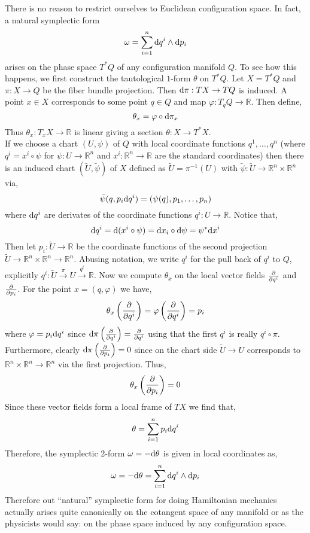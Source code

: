 \documentclass[12pt]{extarticle}
\newcommand{\R}{\mathbb{R}}
\begin{document}
There is no reason to restrict ourselves to Euclidean configuration space. In fact, a natural symplectic form
\[ \omega = \sum_{i = 1}^n \mathrm{d}{q^i} \wedge \mathrm{d}{p_i} \]
arises on the phase space $T^* Q$ of any configuration manifold $Q$. To see how this happens, we first construct the tautological $1$-form $\theta$ on $T^* Q$. Let $X = T^* Q$ and $\pi : X \to Q$ be the fiber bundle projection. Then $\mathrm{d}{\pi} : TX \to TQ$ is induced. A point $x \in X$ corresponds to some point $q \in Q$ and map $\varphi : T_q Q \to \R$. Then define,
\[ \theta_x = \varphi \circ \mathrm{d}{\pi_x} \]
Thus $\theta_x : T_x X \to \R$ is linear giving a section $\theta : X \to T^* X$.
\bigskip\\
If we choose a chart $(U, \psi)$ of $Q$ with local coordinate functions $q^1, \dots, q^n$ (where $q^i = x^i \circ \psi$ for $\psi : U \to \R^n$ and $x^i : \R^n \to \R$ are the standard coordinates) then there is an induced chart $(\tilde{U}, \tilde{\psi})$ of $X$ defined as $\tilde{U} = \pi^{-1}(U)$ with $\tilde{\psi} : \tilde{U} \to \R^n \times \R^n$ via,
\[ \tilde{\psi}(q, p_i \mathrm{d}{q^i}) = (\psi(q), p_1, \dots, p_n) \]
where $\mathrm{d}{q^i}$ are derivates of the coordinate functions $q^i : U \to \R$. Notice that,
\[ \mathrm{d}{q^i} = \mathrm{d}{(x^i \circ \psi)} = \mathrm{d}{x_i} \circ \mathrm{d}{\psi} = \psi^* \mathrm{d}{x^i} \]
Then let $p_i : \tilde{U} \to \R$ be the coordinate functions of the second projection $\tilde{U} \to \R^n \times \R^n \to \R^n$. Abusing notation, we write $q^i$ for the pull back of $q^i$ to $Q$, explicitly $q^i : \tilde{U} \xrightarrow{\pi} U \xrightarrow{q^i} \R$. Now we compute $\theta_x$ on the local vector fields $\frac{\partial{}}{\partial{q^i}}$ and $\frac{\partial{}}{\partial{p_i}}$. For the point $x = (q, \varphi)$ we have,
\[ \theta_x \left( \frac{\partial{}}{\partial{q^i}} \right) = \varphi \left( \frac{\partial{}}{\partial{q^i}} \right) = p_i \]
where $\varphi = p_i \mathrm{d}{q^i}$ since $\mathrm{d}{\pi}\left( \frac{\partial{}}{\partial{q^i}} \right) = \frac{\partial{}}{\partial{q^i}}$ using that the first $q^i$ is really $q^i \circ \pi$. Furthermore, clearly $\mathrm{d}{\pi} \left( \frac{\partial{}}{\partial{p_i}} \right) = 0$ since on the chart side $\tilde{U} \to U$ corresponds to $\R^n \times \R^n \to \R^n$ via the first projection. Thus,
\[ \theta_x \left( \frac{\partial{}}{\partial{p_i}} \right) = 0 \]
Since these vector fields form a local frame of $TX$ we find that,
\[ \theta = \sum_{i = 1}^n p_i \mathrm{d}{q^i} \]
Therefore, the symplectic 2-form $\omega = -\mathrm{d}{\theta}$ is given in local coordinates as,
\[ \omega = - \mathrm{d}{\theta} = \sum_{i = 1}^n \mathrm{d}{q^i} \wedge \mathrm{d}{p_i} \]
Therefore out ``natural'' symplectic form for doing Hamiltonian mechanics actually arises quite canonically on the cotangent space of any manifold or as the physicists would say: on the phase space induced by any configuration space.
\end{document}
